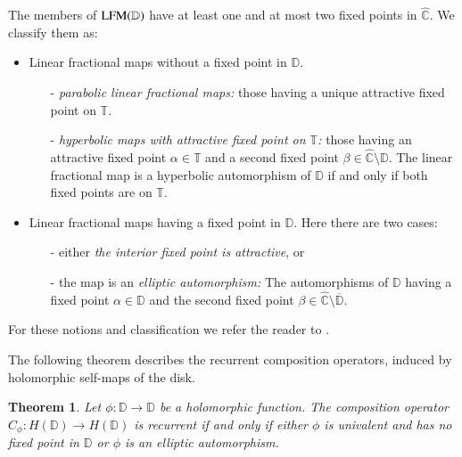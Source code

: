 \documentclass[12pt,leqno]{amsart}
\theoremstyle{plain}
\newtheorem{theorem}[equation]{Theorem}
\theoremstyle{definition}
\numberwithin{equation}{section}
\begin{document}
The members of ${\textnormal{LFM} (\mathbb D)}$ have at least one and at most two fixed points in $\hat{ \mathbb C}$. We classify them as: 
\begin{itemize}
	\item{Linear fractional maps without a fixed point in $\mathbb D$.} 
	\begin{itemize}
		\item [-] \emph{parabolic linear fractional maps:} those having a unique attractive fixed point on $ \mathbb T$. 
		\item [-] \emph{hyperbolic maps with attractive fixed point on $\mathbb T$:} those having an attractive fixed point $\alpha\in\mathbb T$ and a second fixed point $\beta\in\hat{\mathbb C}\setminus \mathbb D$. The linear fractional map is a hyperbolic automorphism of $\mathbb D$ if and only if both fixed points are on $\mathbb T$.
	\end{itemize}
	\item{Linear fractional maps having a fixed point in $\mathbb D$.} Here there are two cases:
	\begin{itemize}
		\item [-] either \emph{the interior fixed point is attractive}, or
		\item [-] the map is an \emph{elliptic automorphism:} The automorphisms of $\mathbb D$ having a fixed point $\alpha\in \mathbb D$ and the second fixed point $\beta\in \hat{\mathbb C}\setminus \overline{\mathbb D}$. 
	\end{itemize}
\end{itemize}

For these notions and classification we refer the reader to \cite{ShapB}.

The following theorem describes the recurrent composition operators, induced by holomorphic self-maps of the disk.

\begin{theorem}
	\label{t.compHD} Let $\phi:\mathbb D\to\mathbb D$ be a holomorphic function. The composition operator $C_\phi:H(\mathbb D)\to H(\mathbb D)$ is recurrent if and only if either $\phi$ is univalent and has no fixed point in $\mathbb D$ or $\phi$ is an elliptic automorphism.  
\end{theorem}
\end{document}
